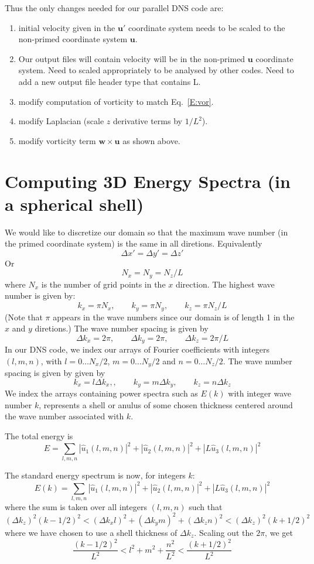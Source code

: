 \documentclass[12pt]{article}
\newcommand{\uv}{\mathbf u}
\newcommand{\up}{\mathbf u'}
\newcommand{\w}{\mathbf w}
\begin{document}
\newpage
Thus the only changes needed for our parallel DNS code are:
\begin{enumerate}
\item initial velocity given in the $\up$ coordinate system 
needs to be scaled to the non-primed coordinate system $\uv$.
\item Our output files will contain velocity will be in the non-primed 
$\uv$ coordinate system.  Need to scaled appropriately  to be analysed
by other codes.  Need to add a new output file header type that
contains L.  
\item modify computation of vorticity to match Eq.~\ref{E:vor}.
\item modify Laplacian (scale $z$ derivative terms by $1/L^2$).
\item modify vorticity term $\w \times \uv$ as shown above.
\end{enumerate}



\section{Computing 3D Energy Spectra (in a spherical shell)}
We would like to discretize our domain so that the 
maximum wave number (in the primed coordinate system) is
the same in all diretions.  Equivalently
\[
\Delta x' = \Delta y' = \Delta z'
\]
Or
\[
N_x  = N_y = N_z/L
\]
where $N_x$ is the number of grid points in the $x$ direction.
The highest wave number is given by:
\[
k_x = \pi N_x, \qquad k_y = \pi N_y, \qquad k_z = \pi N_z/L 
\]
(Note that $\pi$ appears in the wave numbers since our domain is
of length 1 in the $x$ and $y$ diretions.)  The wave number spacing
is given by
\[
\Delta k_x = 2 \pi, \qquad  \Delta k_y = 2 \pi, \qquad  \Delta k_z = 2 \pi / L 
\]
In our DNS code, we index our arrays of Fourier coefficients
with integers $(l,m,n)$, with $l=0 \dots N_x/2$, 
$m=0 \dots N_y/2$ and 
$n=0 \dots N_z/2$.  The wave number spacing is given by
given by
\[
k_x = l \Delta k_x,, \qquad  k_y = m \Delta k_y, \qquad  k_z = n  \Delta k_z
\]
We index the arrays containing power spectra
such as $E(k)$ with integer wave number $k$, represents a shell or anulus
of some chosen thickness centered around the wave number associated
with $k$.

The total energy is
\[
E  = \sum_{l,m,n}  |  {\hat u_1}(l,m,n) |^2 +
 |  {\hat u_2}(l,m,n) |^2 + 
 |  L {\hat u_3}(l,m,n) |^2
\]

The standard energy spectrum is now, for integers $k$:
\[
E(k)  = \sum_{l,m,n}  |  {\hat u_1}(l,m,n) |^2 +
 |  {\hat u_2}(l,m,n) |^2 + 
 |  L {\hat u_3}(l,m,n) |^2
\]
where the sum is taken over all integers $(l,m,n)$ such that
\[
(\Delta k_z)^2 (k-1/2)^2 < (\Delta k_x l)^2 + (\Delta k_y m)^2 + (\Delta k_z n)^2 <  (\Delta k_z)^2 (k+1/2)^2 
\]
where we have chosen to use a shell thickness of $\Delta k_z$.
 Scaling out the $2\pi$, we get
\[
\frac{(k-1/2)^2}{L^2} < l^2 + m^2 + \frac{n^2}{L^2} < \frac{(k+1/2)^2}{L^2}
\]  
\end{document}
